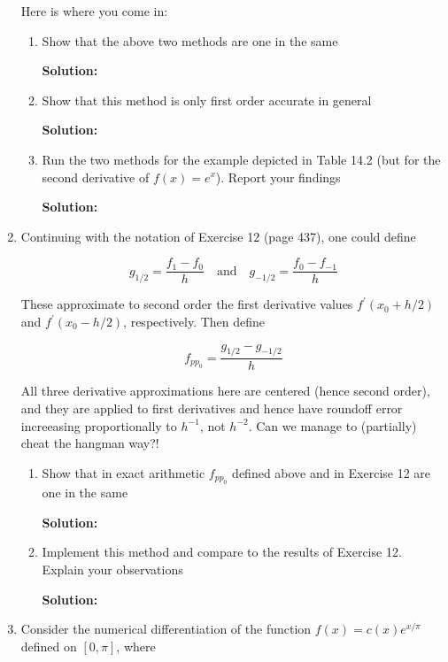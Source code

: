 \documentclass[12pt]{article}
\begin{document}
\begin{enumerate}
\begin{enumerate}[i.]
\end{enumerate}

Here is where you come in:

\begin{enumerate}
\item Show that the above two methods are one in the same

{\bf Solution:}

\item Show that this method is only first order accurate in general

{\bf Solution:}

\item Run the two methods for the example depicted in Table 14.2 (but for the second derivative of $f(x) = e^{x}$). Report your findings

{\bf Solution:}

\end{enumerate}

\item Continuing with the notation of Exercise 12 (page 437), one could define 

\[
	g_{1/2} = \frac{f_{1} - f_{0}}{h}\quad \text{and}\quad g_{-1/2}=\frac{f_{0} - f_{-1}}{h}
\]

These approximate to second order the first derivative values $f^{\prime}(x_{0} + h/2)$ and $f^{\prime}(x_{0} - h/2)$, respectively. Then define

\[
	f_{pp_{0}} = \frac{g_{1/2} - g_{-1/2}}{h}
\]

All three derivative approximations here are centered (hence second order), and they are applied to first derivatives and hence have roundoff error increeasing proportionally to $h^{-1}$, not $h^{-2}$. Can we manage to (partially) cheat the hangman way?!

\begin{enumerate}
\item Show that in exact arithmetic $f_{pp_{0}}$ defined above and in Exercise 12 are one in the same

{\bf Solution:}

\item Implement this method and compare to the results of Exercise 12. Explain your observations

{\bf Solution:}
\end{enumerate}

\item Consider the numerical differentiation of the function $f(x) = c(x) e^{x/\pi}$ defined on $[0, \pi]$, where 


\end{enumerate}
\end{document}
